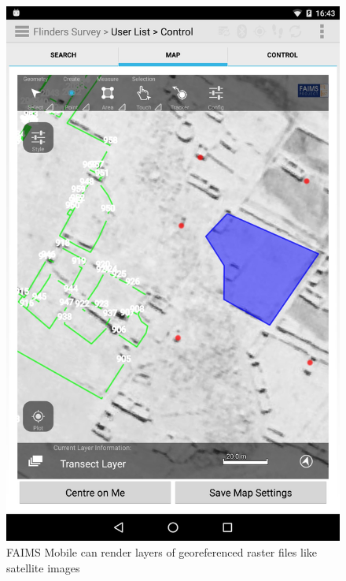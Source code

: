 \documentclass[preprint,12pt, a4paper]{elsarticle}
\begin{document}
\begin{figure}[!htb]
\includegraphics[width=\linewidth]{image-2.jpg}
	\caption{FAIMS Mobile can render layers of georeferenced raster files like satellite images}
	\label{fig:img2}
\endminipage\hfill
{}

\end{figure}
\end{document}
